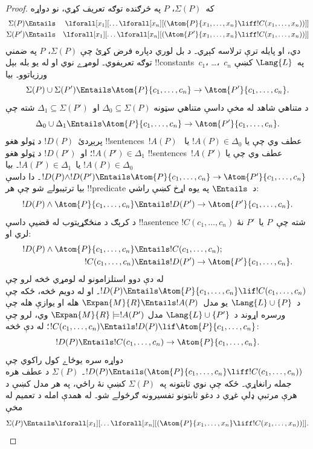 \documentclass[../../../include/open-logic-section]{subfiles}
\begin{document}
\begin{proof}
که~$\Sigma(P)$، $P$ په څرګنده توګه تعريف کړي، نو دواړه
\begin{align*}
  \Sigma(P) & \Entails & \lforall[x_1][\dots \lforall[x_n]
    [(\Atom{P}{x_1,\dots, x_n} \liff !C(x_1,\dots,x_n))]]\\
  \Sigma(P') & \Entails & \lforall[x_1][\dots \lforall[x_n]
    [(\Atom{P'}{x_1,\dots, x_n} \liff !C(x_1,\dots,x_n))]]
\end{align*}
دي، او پايله ترې ترلاسه کېږي۔ د بل لوري دپاره فرض کړئ چې
$\Sigma(P)$، $P$ په ضمني توګه تعريفوي۔ لومړے نوي او له يو بله بېل !!{constant}s~$c_1$،
\dots،~$c_n$ په~$\Lang{L}$ کښې ورزياتوو۔ بيا
\[
\Sigma(P) \cup \Sigma(P') \Entails
\Atom{P}{c_1, \dots, c_n} \to  \Atom{P'}{c_1, \dots, c_n}.
\]
د متناهي شاهد له مخې داسې متناهي سټونه
$\Delta_0 \subseteq \Sigma(P)$ او~$\Delta_1 \subseteq \Sigma(P')$
شته چې
\[
\Delta_0 \cup \Delta_1 \Entails
\Atom{P}{c_1, \dots, c_n} \to \Atom{P'}{c_1, \dots, c_n}.
\]
پرېږدئ~$!D(P)$ د ټولو هغو !!{sentence}s~$!A(P)$ عطف وي چې يا
$!A(P) \in \Delta_0$ يا~$!A(P') \in \Delta_1$؛ او~$!D(P')$ د
ټولو هغو !!{sentence}s~$!A(P')$ عطف وي چې يا
$!A(P) \in \Delta_0$ يا~$!A(P') \in \Delta_1$۔ بيا
$!D(P) \land !D(P') \Entails \Atom{P}{c_1, \dots, c_n} \to
\Atom{P'}{c_1,\dots,c_n}$۔
دا داسې بيا ترتيبولے شو چې هر !!{predicate} د~$\Entails$ په يوه
اړخ کښې راشي:
\[
!D(P) \land \Atom{P}{c_1, \dots, c_n} \Entails
!D(P') \to \Atom{P'}{c_1, \dots, c_n}.
\]
د کرېګ د منځګړيتوب له قضيې داسې !!a{sentence}
$!C(c_1,\dots, c_n)$ شته چې~$P$ يا~$P'$ نۀ لري او:
\begin{align*}
  !D(P) \land \Atom{P}{c_1, \dots, c_n} & \Entails !C(c_1,\dots, c_n); \\
  !C(c_1,\dots, c_n) & \Entails !D(P') \to \Atom{P'}{c_1, \dots, c_n}.
\end{align*}
له دې دوو استلزامونو له لومړي څخه لرو چې
$!D(P) \Entails \Atom{P}{c_1,\dots, c_n} \lif
!C(c_1,\dots, c_n)$۔ او له دويم څخه، ځکه چې د~$\Lang{L} \cup
\{P\}$ يو مدل~$\Expan{M}{R} \Entails !A(P)$ هله او يوازې هله چې
ورسره اړوند د~$\Lang{L} \cup \{P'\}$ مدل
$\Expan{M}{R} \models !A(P')$ وي، لرو چې
$!C(c_1,\dots, c_n) \Entails !D(P) \lif
\Atom{P}{c_1,\dots, c_n}$؛ له دې څخه:
\[
!D(P) \Entails !C(c_1,\dots,c_n) \to \Atom{P}{c_1,\dots, c_n}.
\]
دواړه سره يوځاے کول راکوي چې
$!D(P) \Entails (\Atom{P}{c_1,\dots, c_n}
\liff !C(c_1, \dots, c_n))$۔ $\Sigma(P)$ د عطف هره جمله رانغاړي۔ ځکه چې نوي ثابتونه په~$\Sigma(P)$ کښې نۀ راځي، په هر مدل کښې د هرې مرتبې ډلې غړي د دغو ثابتونو تفسيرونه ګرځولے شو۔ له همدې امله د تعميم له مخې
\[
\Sigma(P) \Entails
\lforall[x_1][\dots\lforall[x_n][(\Atom{P}{x_1,\dots, x_n} \liff
    !C(x_1,\dots, x_n))]].
\]
\end{proof}
\end{document}
